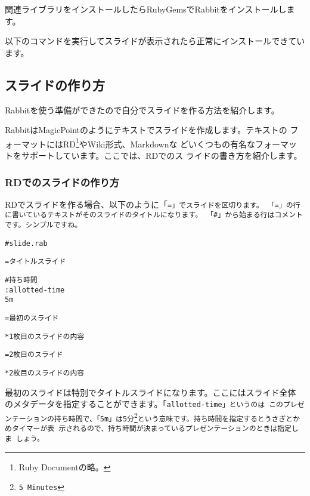 \documentclass[mingoth,a4paper]{jsarticle}
\begin{document}
関連ライブラリをインストールしたらRubyGemsでRabbitをインストールします。

\begin{commandline}
\end{commandline}

以下のコマンドを実行してスライドが表示されたら正常にインストールできています。

\begin{commandline}
\end{commandline}

\subsection{スライドの作り方}

Rabbitを使う準備ができたので自分でスライドを作る方法を紹介します。

RabbitはMagicPointのようにテキストでスライドを作成します。テキストの
フォーマットにはRD\footnote{Ruby Documentの略。}やWiki形式、Markdownな
どいくつもの有名なフォーマットをサポートしています。ここでは、RDでのス
ライドの書き方を紹介します。

\subsubsection{RDでのスライドの作り方}

RDでスライドを作る場合、以下のように「\tt{=}」でスライドを区切ります。
「\tt{=}」の行に書いているテキストがそのスライドのタイトルになります。
「\tt{\#}」から始まる行はコメントです。シンプルですね。

\begin{screen}
\begin{alltt}
# slide.rab

= タイトルスライド

# 持ち時間
: allotted-time
   5m

= 最初のスライド

  * 1枚目のスライドの内容

= 2枚目のスライド

  * 2枚目のスライドの内容
\end{alltt}
\end{screen}

最初のスライドは特別でタイトルスライドになります。ここにはスライド全体
のメタデータを指定することができます。「\tt{allotted-time}」というのは
このプレゼンテーションの持ち時間で、「\tt{5m}」は5分\footnote{5
  Minutes}という意味です。持ち時間を指定するとうさぎとかめタイマーが表
示されるので、持ち時間が決まっているプレゼンテーションのときは指定しま
しょう。
\end{document}

